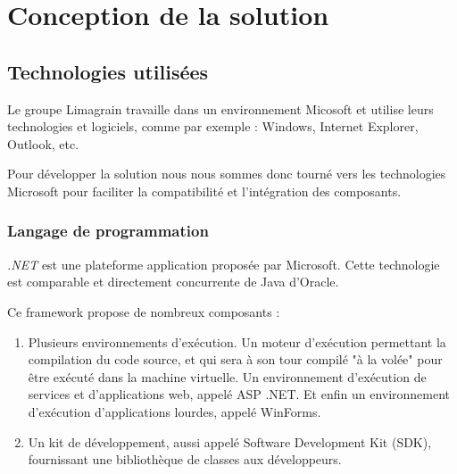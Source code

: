 \cleardoublepage

\chapter{Conception de la solution}


\section{Technologies utilisées}

Le groupe Limagrain travaille dans un environnement Micosoft et utilise leurs technologies et logiciels, comme par exemple : Windows, Internet Explorer, Outlook, etc.

Pour développer la solution nous nous sommes donc tourné vers les technologies Microsoft pour faciliter la compatibilité et l'intégration des composants.


\subsection{Langage de programmation}

\textit{.NET} est une plateforme application proposée par Microsoft. Cette technologie est comparable et directement concurrente de Java d'Oracle.

Ce framework propose de nombreux composants :
\begin{enumerate}
\item Plusieurs environnements d'exécution. Un moteur d'exécution permettant la compilation du code source, et qui sera à son tour compilé "à la volée" pour être exécuté dans la machine virtuelle. Un environnement d'exécution de services et d'applications web, appelé ASP .NET. Et enfin un environnement d'exécution d'applications lourdes, appelé WinForms.
\item Un kit de développement, aussi appelé Software Development Kit (SDK), fournissant une bibliothèque de classes aux développeurs.
\end{enumerate}



